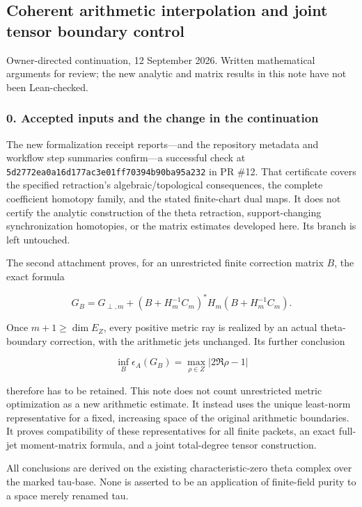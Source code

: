 


\subsection{Coherent arithmetic interpolation and joint tensor boundary
control}\label{pr_14:coherent-arithmetic-interpolation-and-joint-tensor-boundary-control}

Owner-directed continuation, 12 September 2026. Written mathematical
arguments for review; the new analytic and matrix results in this note
have not been Lean-checked.

\subsubsection{0. Accepted inputs and the change in the
continuation}\label{pr_14:accepted-inputs-and-the-change-in-the-continuation}

The new formalization receipt reports---and the repository metadata and
workflow step summaries confirm---a successful check at
\nolinkurl{5d2772ea0a16d177ac3e01ff70394b90ba95a232} in PR \#12. That
certificate covers the specified retraction's algebraic/topological
consequences, the complete coefficient homotopy family, and the stated
finite-chart dual maps. It does not certify the analytic construction of
the theta retraction, support-changing synchronization homotopies, or
the matrix estimates developed here. Its branch is left untouched.

The second attachment proves, for an unrestricted finite correction
matrix \(B\), the exact formula

\[G_B=G_{\perp,m}+(B+H_m^{-1}C_m)^*H_m(B+H_m^{-1}C_m).\tag{0.1}\]

Once \(m+1\ge\dim E_Z\), every positive metric ray is realized by an
actual theta-boundary correction, with the arithmetic jets unchanged.
Its further conclusion

\[\inf_B\epsilon_A(G_B)=\max_{\rho\in Z}|2\Re\rho-1|\tag{0.2}\]

therefore has to be retained. This note does not count unrestricted
metric optimization as a new arithmetic estimate. It instead uses the
unique least-norm representative for a fixed, increasing space of the
original arithmetic boundaries. It proves compatibility of these
representatives for all finite packets, an exact full-jet moment-matrix
formula, and a joint total-degree tensor construction.

All conclusions are derived on the existing characteristic-zero theta
complex over the marked tau-base. None is asserted to be an application
of finite-field purity to a space merely renamed tau.

